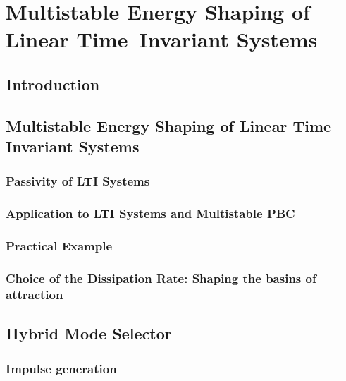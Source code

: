 
\chapter{Multistable Energy Shaping of Linear Time--Invariant Systems}

\label{chap:multistable}
\minitoc

\thispagestyle{empty}

\newpage
\section{Introduction}
%

%
\section{Multistable Energy Shaping of Linear Time--Invariant Systems}\label{sec:MES}
\subsection{Passivity of LTI Systems}
\subsection{Application to LTI Systems and Multistable PBC}
\subsection{Practical Example}
\subsection{Choice of the Dissipation Rate: Shaping the basins of attraction}
%

\section{Hybrid Mode Selector}
\subsection{Impulse generation}
